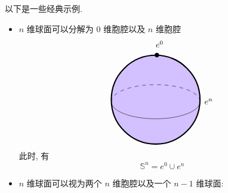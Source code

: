 \begin{example}
    以下是一些经典示例.
    \begin{itemize}
        \item $n$ 维球面可以分解为 $0$ 维胞腔以及 $n$ 维胞腔
        \[\begin{tikzpicture}[x=0.75pt,y=0.75pt,yscale=-1,xscale=1]
        \draw  [fill={rgb, 255:red, 210; green, 192; blue, 255 }  ,fill opacity=1 ][line width=1.5]  (217,132.06) .. controls (217,92.81) and (248.81,61) .. (288.06,61) .. controls (327.3,61) and (359.11,92.81) .. (359.11,132.06) .. controls (359.11,171.3) and (327.3,203.11) .. (288.06,203.11) .. controls (248.81,203.11) and (217,171.3) .. (217,132.06) -- cycle ; 
        \draw  [draw opacity=0][dash pattern={on 4.5pt off 4.5pt}] (217.01,135.79) .. controls (217,135.63) and (217,135.46) .. (217,135.3) .. controls (217,120.21) and (248.81,107.98) .. (288.06,107.98) .. controls (327.3,107.98) and (359.11,120.21) .. (359.11,135.3) .. controls (359.11,135.65) and (359.09,136) .. (359.06,136.35) -- (288.06,135.3) -- cycle ; \draw  [dash pattern={on 4.5pt off 4.5pt}] (217.01,135.79) .. controls (217,135.63) and (217,135.46) .. (217,135.3) .. controls (217,120.21) and (248.81,107.98) .. (288.06,107.98) .. controls (327.3,107.98) and (359.11,120.21) .. (359.11,135.3) .. controls (359.11,135.65) and (359.09,136) .. (359.06,136.35) ;  
        \draw  [draw opacity=0] (359.1,134.8) .. controls (359.11,134.97) and (359.11,135.13) .. (359.11,135.3) .. controls (359.11,150.39) and (327.3,162.62) .. (288.06,162.62) .. controls (248.81,162.62) and (217,150.39) .. (217,135.3) .. controls (217,134.94) and (217.02,134.59) .. (217.05,134.24) -- (288.06,135.3) -- cycle ; \draw   (359.1,134.8) .. controls (359.11,134.97) and (359.11,135.13) .. (359.11,135.3) .. controls (359.11,150.39) and (327.3,162.62) .. (288.06,162.62) .. controls (248.81,162.62) and (217,150.39) .. (217,135.3) .. controls (217,134.94) and (217.02,134.59) .. (217.05,134.24) ;  
        \draw  [color={rgb, 255:red, 0; green, 0; blue, 0 }  ,draw opacity=1 ][line width=5.25] [line join = round][line cap = round] (290.04,60.69) .. controls (290.04,60.69) and (290.04,60.69) .. (290.04,60.69) ;
        \draw (365,129.4) node [anchor=north west][inner sep=0.75pt]    {$e^{n}$};
        \draw (287,36.4) node [anchor=north west][inner sep=0.75pt]    {$e^{0}$};
        \end{tikzpicture}\]
        此时, 有
        \[
            \mathbb{S}^n = e^0 \cup e^n
        \]
        \item $n$ 维球面可以视为两个 $n$ 维胞腔以及一个 $n-1$ 维球面:

\end{itemize}
\end{example}
